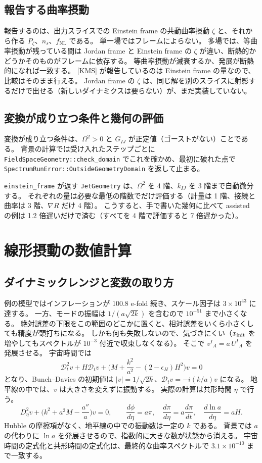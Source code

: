 \documentclass[a4paper,11pt]{ltjsarticle}
\newcommand{\fnl}{f_{\mathrm{NL}}}
\newcommand{\code}[1]{\texttt{#1}}
\newcommand{\Dt}{\mathcal{D}_t}
\begin{document}
\subsection{報告する曲率摂動}
報告するのは、出力スライスでの Einstein frame の共動曲率摂動 $\zeta$ と、それから作る $P_\zeta$、$n_s$、$\fnl$ である。
単一場ではフレームによらない。
多場では、等曲率摂動が残っている間は Jordan frame と Einstein frame の $\zeta$ が違い、断熱的かどうかそのものがフレームに依存する\cite{WMS2012}。
等曲率摂動が減衰するか、発展が断熱的になれば一致する。
[KMS] が報告しているのは Einstein frame の量なので、比較はそのまま行える。
Jordan frame の $\zeta$ は、同じ解を別のスライスに射影するだけで出せる（新しいダイナミクスは要らない）が、まだ実装していない。

\subsection{変換が成り立つ条件と幾何の評価}
変換が成り立つ条件は、$\Omega^2>0$ と $G_{IJ}$ が正定値（ゴーストがない）ことである。
背景の計算では受け入れたステップごとに \code{FieldSpaceGeometry::check\_domain} でこれを確かめ、最初に破れた点で \code{SpectrumRunError::OutsideGeometryDomain} を返して止まる。


\code{einstein\_frame} が返す \code{JetGeometry} は、$\Omega^2$ を 4 階、$k_{IJ}$ を 3 階まで自動微分する。
それぞれの量は必要な最低の階数でだけ評価する（計量は 1 階、接続と曲率は 3 階、$\nabla R$ だけ 4 階）。
こうすると、手で書いた幾何に比べて assisted の例は 1.2 倍遅いだけで済む（すべてを 4 階で評価すると 7 倍遅かった）。

\section{線形摂動の数値計算}
\label{app:numerics}

\subsection{ダイナミックレンジと変数の取り方}
例の模型ではインフレーションが 100.8 e-fold 続き、スケール因子は $3\times10^{43}$ に達する。
一方、モードの振幅は $1/(a\sqrt{2k})$ を含むので $10^{-51}$ まで小さくなる。
絶対誤差の下限をこの範囲のどこかに置くと、相対誤差をいくら小さくしても精度が頭打ちになる。
しかも何も失敗しないので、気づきにくい（$x_{\rm init}$ を増やしてもスペクトルが $10^{-3}$ 付近で収束しなくなる）。
そこで $v^I{}_A=a\,U^I{}_A$ を発展させる。
宇宙時間では
\[
\Dt^2v+H\Dt v+\Big(M+\frac{k^2}{a^2}-(2-\epsilon_H)H^2\Big)v=0
\]
となり、Bunch--Davies の初期値は $|v|=1/\sqrt{2k}$、$\Dt v=-i(k/a)v$ になる。
地平線の中では、$v$ は大きさを変えずに振動する。
実際の計算は共形時間 $\eta$ で行う。
\[
D_\eta^2v+\Big(k^2+a^2M-\frac{a''}{a}\Big)v=0,\qquad
\frac{d\phi}{d\eta}=a\pi,\quad\frac{d\pi}{d\eta}=a\frac{d\pi}{dt},\quad\frac{d\ln a}{d\eta}=aH .
\]
Hubble の摩擦項がなく、地平線の中での振動数は一定の $k$ である。
背景では $a$ の代わりに $\ln a$ を発展させるので、指数的に大きな数が状態から消える。
宇宙時間の定式化と共形時間の定式化は、最終的な曲率スペクトルで $3.1\times10^{-10}$ まで一致する。
\end{document}

